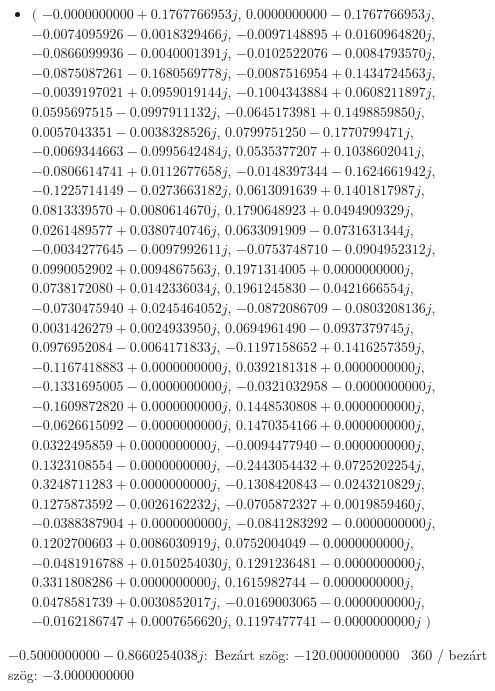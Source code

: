 \documentclass[14pt,a4paper]{article}
\begin{document}
\begin{itemize}
\item
$\big($
$-0.0000000000+0.1767766953j$, $0.0000000000-0.1767766953j$, $-0.0074095926-0.0018329466j$, $-0.0097148895+0.0160964820j$, $-0.0866099936-0.0040001391j$, $-0.0102522076-0.0084793570j$, $-0.0875087261-0.1680569778j$, $-0.0087516954+0.1434724563j$, $-0.0039197021+0.0959019144j$, $-0.1004343884+0.0608211897j$, $0.0595697515-0.0997911132j$, $-0.0645173981+0.1498859850j$, $0.0057043351-0.0038328526j$, $0.0799751250-0.1770799471j$, $-0.0069344663-0.0995642484j$, $0.0535377207+0.1038602041j$, $-0.0806614741+0.0112677658j$, $-0.0148397344-0.1624661942j$, $-0.1225714149-0.0273663182j$, $0.0613091639+0.1401817987j$, $0.0813339570+0.0080614670j$, $0.1790648923+0.0494909329j$, $0.0261489577+0.0380740746j$, $0.0633091909-0.0731631344j$, $-0.0034277645-0.0097992611j$, $-0.0753748710-0.0904952312j$, $0.0990052902+0.0094867563j$, $0.1971314005+0.0000000000j$, $0.0738172080+0.0142336034j$, $0.1961245830-0.0421666554j$, $-0.0730475940+0.0245464052j$, $-0.0872086709-0.0803208136j$, $0.0031426279+0.0024933950j$, $0.0694961490-0.0937379745j$, $0.0976952084-0.0064171833j$, $-0.1197158652+0.1416257359j$, $-0.1167418883+0.0000000000j$, $0.0392181318+0.0000000000j$, $-0.1331695005-0.0000000000j$, $-0.0321032958-0.0000000000j$, $-0.1609872820+0.0000000000j$, $0.1448530808+0.0000000000j$, $-0.0626615092-0.0000000000j$, $0.1470354166+0.0000000000j$, $0.0322495859+0.0000000000j$, $-0.0094477940-0.0000000000j$, $0.1323108554-0.0000000000j$, $-0.2443054432+0.0725202254j$, $0.3248711283+0.0000000000j$, $-0.1308420843-0.0243210829j$, $0.1275873592-0.0026162232j$, $-0.0705872327+0.0019859460j$, $-0.0388387904+0.0000000000j$, $-0.0841283292-0.0000000000j$, $0.1202700603+0.0086030919j$, $0.0752004049-0.0000000000j$, $-0.0481916788+0.0150254030j$, $0.1291236481-0.0000000000j$, $0.3311808286+0.0000000000j$, $0.1615982744-0.0000000000j$, $0.0478581739+0.0030852017j$, $-0.0169003065-0.0000000000j$, $-0.0162186747+0.0007656620j$, $0.1197477741-0.0000000000j$
$\big)$
\end{itemize}
$-0.5000000000-0.8660254038j$:\
Bezárt szög: $-120.0000000000$ \
360 / bezárt szög: $-3.0000000000$\
\end{document}
